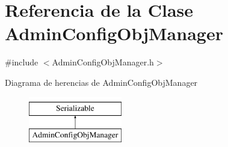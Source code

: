 \hypertarget{classAdminConfigObjManager}{\section{\-Referencia de la \-Clase \-Admin\-Config\-Obj\-Manager}
\label{classAdminConfigObjManager}
}


{\ttfamily \#include $<$\-Admin\-Config\-Obj\-Manager.\-h$>$}

\-Diagrama de herencias de \-Admin\-Config\-Obj\-Manager\begin{figure}[H]
\begin{center}
\leavevmode
\includegraphics[height=2.000000cm]{classAdminConfigObjManager}
\end{center}
\end{figure}
